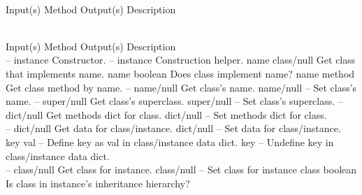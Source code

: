 \begin{longtable}{}
\caption{vclass summary}
\\
\hline
\optableent
	{Input(s)}
	{Method}
	{Output(s)}
	{Description}
\hline \hline
\endfirsthead
\caption[]{\emph{continued}} \\
\hline
\optableent
	{Input(s)}
	{Method}
	{Output(s)}
	{Description}
\hline \hline \endhead
{} \endfoot
\hline \endlastfoot
 \\
\hline \hline
\optableent
	{--}
	{{\bf {}}}
	{instance}
	{Constructor.}
\hline
\optableent
	{--}
	{{\bf {}}}
	{instance}
	{Construction helper.}
\hline
\optableent
	{name}
	{{\bf {}}}
	{class/null}
	{Get class that implements name.}
\hline
\optableent
	{name}
	{{\bf {}}}
	{boolean}
	{Does class implement name?}
\hline
\optableent
	{name}
	{{\bf {}}}
	{method}
	{Get class method by name.}
\hline
\optableent
	{--}
	{{\bf {}}}
	{name/null}
	{Get class's name.}
\hline
\optableent
	{name/null}
	{{\bf {}}}
	{--}
	{Set class's name.}
\hline
\optableent
	{--}
	{{\bf {}}}
	{super/null}
	{Get class's superclass.}
\hline
\optableent
	{super/null}
	{{\bf {}}}
	{--}
	{Set class's superclass.}
\hline
\optableent
	{--}
	{{\bf {}}}
	{dict/null}
	{Get methods dict for class.}
\hline
\optableent
	{dict/null}
	{{\bf {}}}
	{--}
	{Set methods dict for class.}
\hline \hline
{} \\
\hline \hline
\optableent
	{--}
	{{\bf {}}}
	{dict/null}
	{Get data for class/instance.}
\hline
\optableent
	{dict/null}
	{{\bf {}}}
	{--}
	{Set data for class/instance.}
\hline
\optableent
	{key val}
	{{\bf {}}}
	{--}
	{Define key as val in class/instance data dict.}
\hline
\optableent
	{key}
	{{\bf {}}}
	{--}
	{Undefine key in class/instance data dict.}
\hline \hline
{} \\
\hline \hline
\optableent
	{--}
	{{\bf {}}}
	{class/null}
	{Get class for instance.}
\hline
\optableent
	{class/null}
	{{\bf {}}}
	{--}
	{Set class for instance}
\hline
\optableent
	{class}
	{{\bf {}}}
	{boolean}
	{Is class in instance's inheritance hierarchy?}
\end{longtable}

